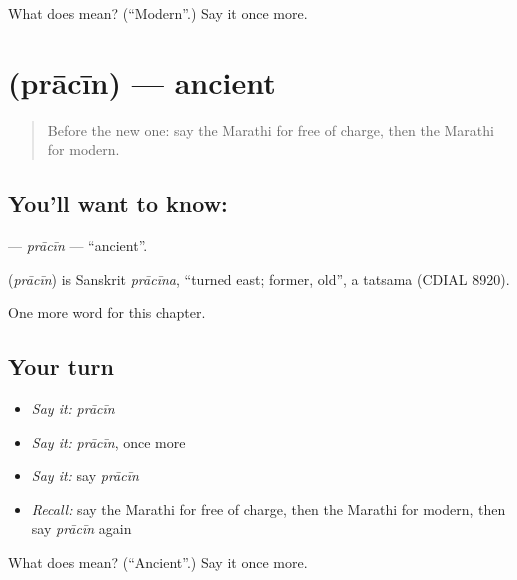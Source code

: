 \begin{tcolorbox}[breakable,colback=teal!4,colframe=teal!35!black,title={Before you move on}]
What does  mean? (\textquotedblleft{}Modern\textquotedblright{}.) Say it once more.
\end{tcolorbox}
\section[\texorpdfstring{\mr{प्राचीन} (prācīn)}{प्राचीन (prācīn)}]{ (prācīn) — ancient}

\label{lesson:MR-C205-pracin}



\begin{quote}
Before the new one: say the Marathi for free of charge, then the Marathi for modern.
\end{quote}

\subsection*{You'll want to know: }
\textbf{} — \emph{prācīn} — \textquotedblleft{}ancient\textquotedblright{}.

\begin{cousinweb}
\textbf{} (\emph{prācīn}) is Sanskrit \emph{prācīna}, \textquotedblleft{}turned east; former, old\textquotedblright{}, a tatsama (CDIAL 8920).
\end{cousinweb}

\begin{grammarlens}[title={What you've built}]
One more word for this chapter.
\end{grammarlens}

\subsection*{Your turn}
\begin{itemize}
\raggedright
  \item \emph{Say it:} \emph{prācīn}
  \item \emph{Say it:} \emph{prācīn}, once more
  \item \emph{Say it:} say \emph{prācīn}
  \item \emph{Recall:} say the Marathi for free of charge, then the Marathi for modern, then say \emph{prācīn} again
\end{itemize}

\begin{tcolorbox}[breakable,colback=teal!4,colframe=teal!35!black,title={Before you move on}]
What does  mean? (\textquotedblleft{}Ancient\textquotedblright{}.) Say it once more.
\end{tcolorbox}
